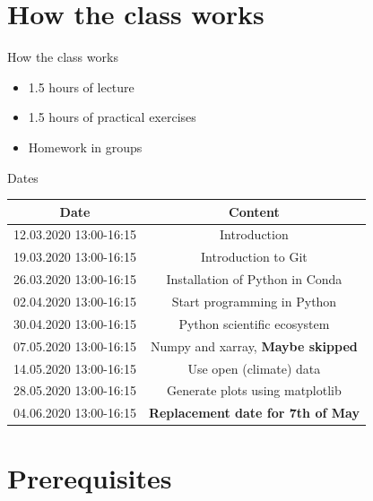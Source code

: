 \documentclass[10pt,color=usenames,dvipsnames]{beamer}
\begin{document}
\section{How the class works}

\begin{frame}{How the class works}
	\begin{itemize}
		\item 1.5 hours of lecture
		\item 1.5 hours of practical exercises
		\item Homework in groups
	\end{itemize}
\end{frame}

\begin{frame}{Dates}
	
	\begin{table}
	
	\begin{tabular}{|c|c|}
		\hline
		Date&Content\\
		\hline
		12.03.2020	13:00-16:15	& Introduction \\
	
		19.03.2020	13:00-16:15&Introduction to Git\\
	
		26.03.2020	13:00-16:15&Installation of Python in Conda\\
	
		02.04.2020	13:00-16:15&Start programming in Python\\
	
		30.04.2020	13:00-16:15&Python scientific ecosystem\\
	
		07.05.2020	13:00-16:15&Numpy and xarray, \textbf{Maybe skipped}\\

		14.05.2020	13:00-16:15& Use open (climate) data\\	
	
		28.05.2020	13:00-16:15&Generate plots using matplotlib\\
		
		04.06.2020  13:00-16:15&\textbf{Replacement date for 7th of May}\\
		\hline
	\end{tabular}
\end{table}

\end{frame}


\section{Prerequisites}
\end{document}

